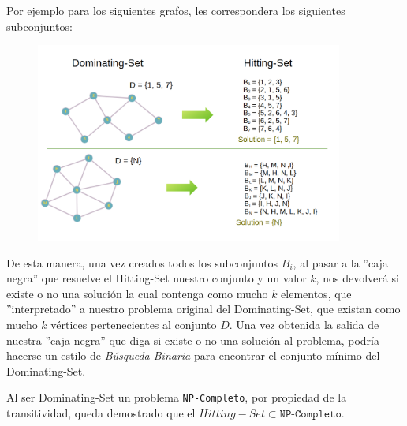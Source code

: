 Por ejemplo para los siguientes grafos, les correspondera los siguientes subconjuntos:

\begin{figure}[H]
	\centering
	\includegraphics[width=0.9\textwidth]{img/dshs.png}
\end{figure}

De esta manera, una vez creados todos los subconjuntos $B_i$, al pasar a la ''caja negra'' que resuelve el Hitting-Set nuestro conjunto y un valor $k$, nos devolverá si existe o no una solución la cual contenga como mucho $k$ elementos, que ''interpretado'' a nuestro problema original del Dominating-Set, que existan como mucho $k$ vértices pertenecientes al conjunto $D$. Una vez obtenida la salida de nuestra ''caja negra'' que diga si existe o no una solución al problema, podría hacerse un estilo de \textit{Búsqueda Binaria} para encontrar el conjunto mínimo del Dominating-Set.

Al ser Dominating-Set un problema \texttt{NP-Completo}, por propiedad de la transitividad, queda demostrado que el $Hitting-Set \subset \texttt{NP-Completo}$.
